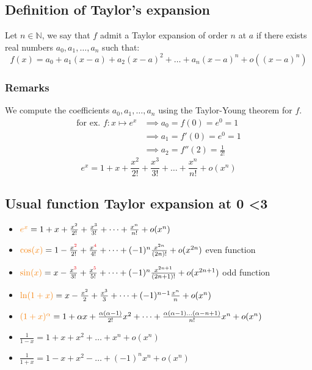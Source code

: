 \documentclass[notitlepage]{math}
\begin{document}
\subsection{Definition of Taylor's expansion}
Let $n \in \mathbb{N}$, we say that $f$ admit a Taylor expansion of order $n$ at $a$ if there exists real numbers $a_0, a_1, \dots, a_n$ such that:
\[f(x) = a_0 + a_1(x-a) + a_2(x-a)^2 + \dots + a_n(x-a)^n + o((x-a)^n)\]
\subsubsection{Remarks}
We compute the coefficients $a_0, a_1, \dots, a_n$ using the Taylor-Young theorem for $f$.
\begin{align*}
    \text{for ex. } f: x \mapsto e^x &\implies a_0 = f(0) = e^0 = 1\\
    &\implies a_1 = f'(0) = e^0 = 1 \\
    &\implies a_2 = f''(2) = \frac{1}{2!}
\end{align*}
\[e^x = 1 + x + \frac{x^2}{2!} + \frac{x^3}{3!} + \dots + \frac{x^n}{n!} + o(x^n)\]
\subsection{Usual function Taylor expansion at 0 <3}
\begin{itemize}
    \item ${\color{BurntOrange}e^x} = 1 + x + \frac{x^2}{2!} + \frac{x^3}{3!} + \dots + \frac{x^n}{n!} + o(x^n)$
    \item ${\color{BurntOrange}\cos(x)} = 1 - \frac{x^{\color{Red}2}}{2!} + \frac{x^{\color{Red}4}}{4!} + \dots + (-1)^n \frac{x^{2n}}{(2n)!} + o(x^{2n})$ {\color{Red} even function}
    \item ${\color{BurntOrange}\sin(x)} = x - \frac{x^{\color{Red}3}}{3!} + \frac{x^{\color{Red}5}}{5!} + \dots + (-1)^n \frac{x^{2n+1}}{(2n+1)!} + o(x^{2n+1})$ {\color{Red} odd function}
    \item ${\color{BurntOrange}\ln(1+x)} = x - \frac{x^2}{2} + \frac{x^3}{3} + \dots + (-1)^{n-1} \frac{x^n}{n} + o(x^n)$
    \item ${\color{BurntOrange}(1 + x )^{\alpha}} = 1 + \alpha x + \frac{\alpha(\alpha-1)}{2!} x^2 + \dots + \frac{\alpha(\alpha-1)\dots(\alpha-n+1)}{n!} x^n + o(x^n)$
    \item $\frac{1}{1-x} = 1 + x + x^2 + \dots + x^n + o(x^n)$
    \item $\frac{1}{1+x} = 1 - x + x^2 - \dots + (-1)^n x^n + o(x^n)$
\end{itemize}
\end{document}
